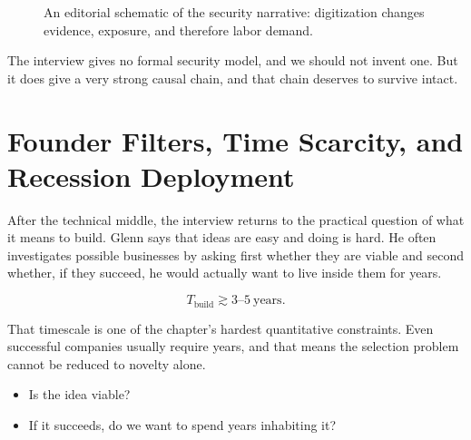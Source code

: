 \begin{figure}[h]
\centering
{}
\caption{An editorial schematic of the security narrative: digitization changes evidence, exposure, and therefore labor demand.}
\end{figure}

The interview gives no formal security model, and we should not invent one. But it does give a very strong causal chain, and that chain deserves to survive intact.

\section{Founder Filters, Time Scarcity, and Recession Deployment}

After the technical middle, the interview returns to the practical question of what it means to build. Glenn says that ideas are easy and doing is hard. He often investigates possible businesses by asking first whether they are viable and second whether, if they succeed, he would actually want to live inside them for years.

\begin{equation}
T_{\mathrm{build}} \gtrsim 3\text{--}5\ \mathrm{years}.
\end{equation}

That timescale is one of the chapter's hardest quantitative constraints. Even successful companies usually require years, and that means the selection problem cannot be reduced to novelty alone.

\begin{itemize}
\item Is the idea viable?
\item If it succeeds, do we want to spend years inhabiting it?
\end{itemize}

